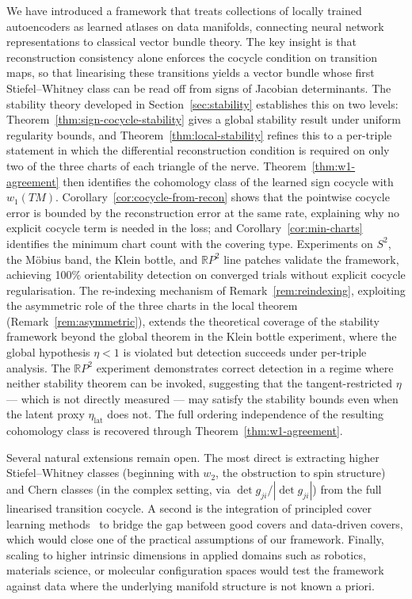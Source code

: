 \documentclass[11pt]{article}
\theoremstyle{plain}
\theoremstyle{definition}
\theoremstyle{remark}
\begin{document}
We have introduced a framework that treats collections of locally trained autoencoders as learned atlases on data manifolds, connecting neural network representations to classical vector bundle theory. The key insight is that reconstruction consistency alone enforces the cocycle condition on transition maps, so that linearising these transitions yields a vector bundle whose first Stiefel--Whitney class can be read off from signs of Jacobian determinants. The stability theory developed in Section~\ref{sec:stability} establishes this on two levels: Theorem~\ref{thm:sign-cocycle-stability} gives a global stability result under uniform regularity bounds, and Theorem~\ref{thm:local-stability} refines this to a per-triple statement in which the differential reconstruction condition is required on only two of the three charts of each triangle of the nerve. Theorem~\ref{thm:w1-agreement} then identifies the cohomology class of the learned sign cocycle with $w_1(TM)$. Corollary~\ref{cor:cocycle-from-recon} shows that the pointwise cocycle error is bounded by the reconstruction error at the same rate, explaining why no explicit cocycle term is needed in the loss; and Corollary~\ref{cor:min-charts} identifies the minimum chart count with the covering type. Experiments on $S^2$, the M\"obius band, the Klein bottle, and $\mathbb{R}P^2$ line patches validate the framework, achieving 100\% orientability detection on converged trials without explicit cocycle regularisation. The re-indexing mechanism of Remark~\ref{rem:reindexing}, exploiting the asymmetric role 
of the three charts in the local theorem 
(Remark~\ref{rem:asymmetric}), extends the theoretical 
coverage of the stability framework beyond the global 
theorem in the Klein bottle experiment, where the global 
hypothesis $\eta < 1$ is violated but detection succeeds 
under per-triple analysis.  The $\mathbb{R}P^2$ experiment 
demonstrates correct detection in a regime where neither 
stability theorem can be invoked, suggesting that the 
tangent-restricted $\eta$ --- which is not directly 
measured --- may satisfy the stability bounds even when the 
latent proxy $\eta_{\mathrm{lat}}$ does not.  The full 
ordering independence of the resulting cohomology class is 
recovered through Theorem~\ref{thm:w1-agreement}.

Several natural extensions remain open. The most direct is extracting higher Stiefel--Whitney classes (beginning with $w_2$, the obstruction to spin structure) and Chern classes (in the complex setting, via $\det g_{ji} / |\det g_{ji}|$) from the full linearised transition cocycle. A second is the integration of principled cover learning methods~\cite{scoccola2025coverlearninglargescaletopology} to bridge the gap between good covers and data-driven covers, which would close one of the practical assumptions of our framework. Finally, scaling to higher intrinsic dimensions in applied domains such as robotics, materials science, or molecular configuration spaces would test the framework against data where the underlying manifold structure is not known a priori.
\end{document}
